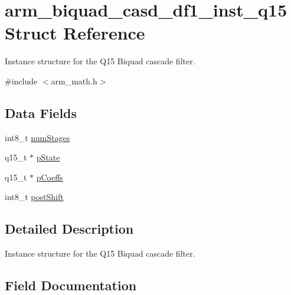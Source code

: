 \hypertarget{structarm__biquad__casd__df1__inst__q15}{}\section{arm\+\_\+biquad\+\_\+casd\+\_\+df1\+\_\+inst\+\_\+q15 Struct Reference}
\label{structarm__biquad__casd__df1__inst__q15}


Instance structure for the Q15 Biquad cascade filter.  




{\ttfamily \#include $<$arm\+\_\+math.\+h$>$}

\subsection*{Data Fields}
\begin{DoxyCompactItemize}
\item 
int8\+\_\+t \mbox{\hyperlink{structarm__biquad__casd__df1__inst__q15_af59c4ceb94f92d6613492b37e7c949de}{num\+Stages}}
\item 
q15\+\_\+t $\ast$ \mbox{\hyperlink{structarm__biquad__casd__df1__inst__q15_ae29dfdb736374fcddaeaec4b7770170c}{p\+State}}
\item 
q15\+\_\+t $\ast$ \mbox{\hyperlink{structarm__biquad__casd__df1__inst__q15_a7ca181a37f714d174445f486bebce26f}{p\+Coeffs}}
\item 
int8\+\_\+t \mbox{\hyperlink{structarm__biquad__casd__df1__inst__q15_a3603cbf084938b6931bcb05dfe487f09}{post\+Shift}}
\end{DoxyCompactItemize}


\subsection{Detailed Description}
Instance structure for the Q15 Biquad cascade filter. 

\subsection{Field Documentation}
\mbox{\label{structarm__biquad__casd__df1__inst__q15_af59c4ceb94f92d6613492b37e7c949de}} 
